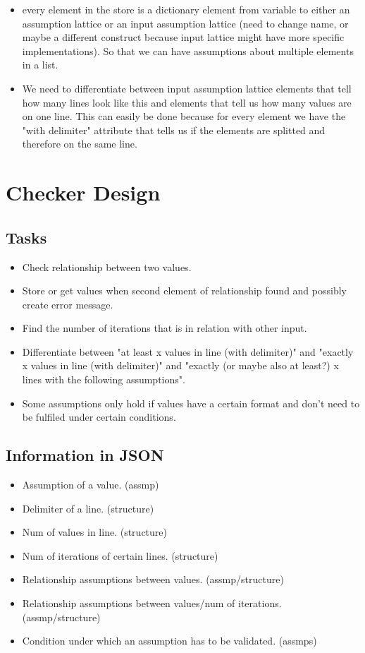 \documentclass[11pt]{article}
\begin{document}
\begin{itemize}
  \item every element in the store is a dictionary element from variable to either an assumption lattice or an input assumption lattice (need to change name, or maybe a different construct because input lattice might have more specific implementations). So that we can have assumptions about multiple elements in a list. 
  \item We need to differentiate between input assumption lattice elements that tell how many lines look like this and elements that tell us how many values are on one line. This can easily be done because for every element we have the "with delimiter" attribute that tells us if the elements are splitted and therefore on the same line.
\end{itemize}


\section{Checker Design}

\subsection{Tasks}

\begin{itemize}
  \item Check relationship between two values.
  \item Store or get values when second element of relationship found and possibly create error message.
  \item Find the number of iterations that is in relation with other input.
  \item Differentiate between "at least x values in line (with delimiter)" and "exactly x values in line (with delimiter)" and "exactly (or maybe also at least?) x lines with the following assumptions".
  \item Some assumptions only hold if values have a certain format and don't need to be fulfiled under certain conditions.
\end{itemize}

\subsection{Information in JSON}

\begin{itemize}
  \item Assumption of a value. (assmp)
  \item Delimiter of a line. (structure)
  \item Num of values in line. (structure)
  \item Num of iterations of certain lines. (structure)
  \item Relationship assumptions between values. (assmp/structure)
  \item Relationship assumptions between values/num of iterations. (assmp/structure)
  \item Condition under which an assumption has to be validated. (assmps)
\end{itemize}
\end{document}
